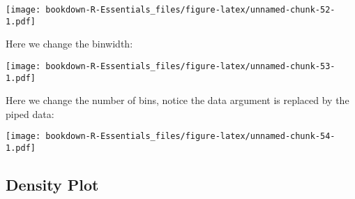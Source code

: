 \documentclass[
]{book}
\newenvironment{Shaded}{\begin{snugshade}}{\end{snugshade}}
\newcommand{\DataTypeTok}[1]{\textcolor[rgb]{0.13,0.29,0.53}{#1}}
\newcommand{\DecValTok}[1]{\textcolor[rgb]{0.00,0.00,0.81}{#1}}
\newcommand{\FloatTok}[1]{\textcolor[rgb]{0.00,0.00,0.81}{#1}}
\newcommand{\KeywordTok}[1]{\textcolor[rgb]{0.13,0.29,0.53}{\textbf{#1}}}
\newcommand{\NormalTok}[1]{#1}
\newcommand{\OperatorTok}[1]{\textcolor[rgb]{0.81,0.36,0.00}{\textbf{#1}}}
\newcommand{\StringTok}[1]{\textcolor[rgb]{0.31,0.60,0.02}{#1}}
\begin{document}
\texttt{[image: bookdown-R-Essentials\_files/figure-latex/unnamed-chunk-52-1.pdf]}

Here we change the binwidth:

\begin{Shaded}
\end{Shaded}

\texttt{[image: bookdown-R-Essentials\_files/figure-latex/unnamed-chunk-53-1.pdf]}

Here we change the number of bins, notice the data argument is replaced by the piped data:

\begin{Shaded}
\end{Shaded}

\texttt{[image: bookdown-R-Essentials\_files/figure-latex/unnamed-chunk-54-1.pdf]}

\hypertarget{density-plot}{%
\subsection{Density Plot}\label{density-plot}}
\end{document}
